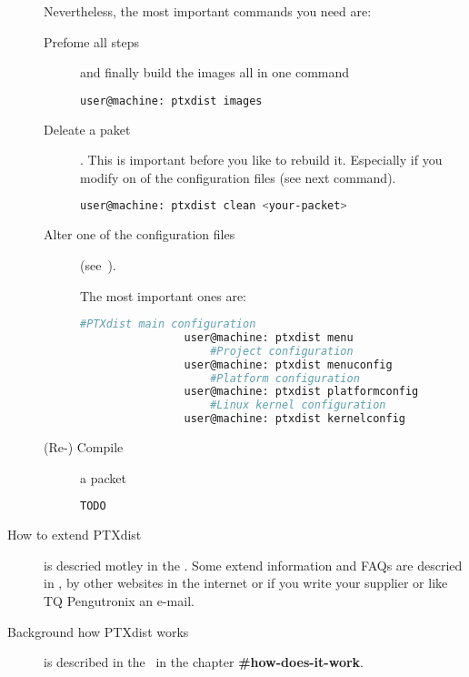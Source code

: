 \begin{description}
       Nevertheless, the most important commands you need are:

\lstset{style=bash}

        \begin{description}
            \item[Prefome all steps] and finally build the images all in one
                command
            \begin{lstlisting}[language=bash,numbers=none,caption=Build all
                images with PTXdist]
                user@machine: ptxdist images
            \end{lstlisting}
        \item[Deleate a paket]. This is important before you like to rebuild it.
            Especially if you modify on of the configuration files (see next
            command).

            \begin{lstlisting}[language=bash,numbers=none,caption=Deleat a
                builded packet from PTXdsits scope]
                user@machine: ptxdist clean <your-packet>
            \end{lstlisting}
        \item[Alter one of the configuration files] (see~\cite[PTXdist user
            manual]{ptxdist_manual}).

            The most important ones are:

            \begin{lstlisting}[language=bash,numbers=none,caption=Alter a
                configuration]
                    #PTXdist main configuration
                user@machine: ptxdist menu
                    #Project configuration
                user@machine: ptxdist menuconfig
                    #Platform configuration
                user@machine: ptxdist platformconfig
                    #Linux kernel configuration
                user@machine: ptxdist kernelconfig
            \end{lstlisting}
        \item[(Re-) Compile] a packet
            \begin{lstlisting}[language=bash,numbers=none,caption=Recompile a
                paket with PTXdist]
                    TODO
            \end{lstlisting}
        \end{description}

    \item[How to extend PTXdist] is descried motley in the
        \textbf{\cite[developer guide]{ptxdist_developer}}. Some extend
        information and \glspl{FAQ} are descried in
        \textbf{\cite{ptxdist_workflows}}, by other websites in the internet
        or if you write your supplier or like TQ Pengutronix an e-mail.

    \item[Background how PTXdist works] is described in the~\cite[PTXdist Users
        Manual]{ptxdist_manual} in the chapter \textbf{\#how-does-it-work}.
\end{description}


